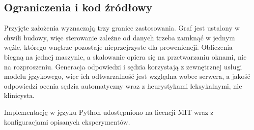 \subsection{Ograniczenia i kod źródłowy}
Przyjęte założenia wyznaczają trzy granice zastosowania. Graf jest ustalony w chwili budowy, więc
sterowanie zależne od danych trzeba zamknąć w jednym węźle, którego wnętrze pozostaje
nieprzejrzyste dla proweniencji. Obliczenia biegną na jednej maszynie, a skalowanie opiera się na
przetwarzaniu oknami, nie na rozproszeniu. Generacja odpowiedzi i sędzia korzystają z zewnętrznej
usługi modelu językowego, więc ich odtwarzalność jest względna wobec serwera, a jakość odpowiedzi
ocenia sędzia automatyczny wraz z heurystykami leksykalnymi, nie klinicysta.

Implementację w języku Python udostępniono na licencji MIT wraz z konfiguracjami opisanych
eksperymentów.
